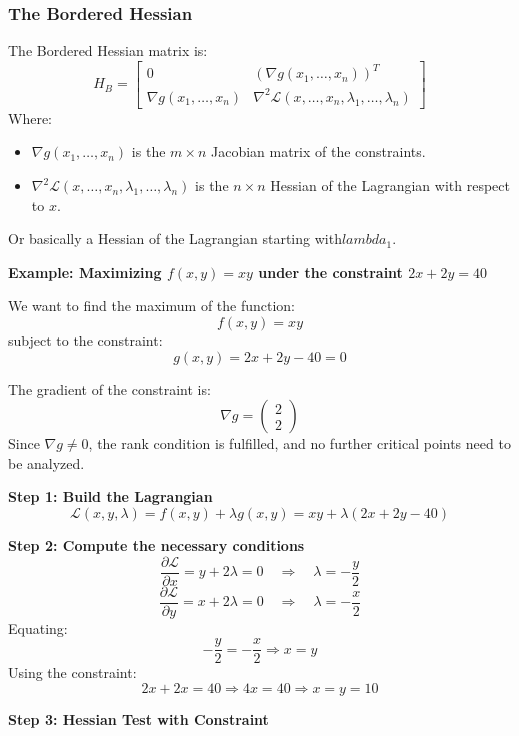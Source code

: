 \subsubsection{The Bordered Hessian}
The Bordered Hessian matrix is:
\[
H_B =
\begin{bmatrix}
0 & {\left( \nabla g(x_1, \dots, x_n) \right)}^T \\
\nabla g(x_1, \dots, x_n) & \nabla^2 \mathcal{L}(x, \dots, x_n, \lambda_1, \dots, \lambda_n)
\end{bmatrix}
\]
Where:
\begin{itemize}[label=\(-\)]
  \item \( \nabla  g(x_1, \dots, x_n) \) is the \( m \times n \) Jacobian matrix of the constraints.
  \item \( \nabla^2 \mathcal{L}(x, \dots, x_n, \lambda_1, \dots, \lambda_n) \) is the \( n \times n \) Hessian of the Lagrangian with respect to \( x \).
\end{itemize}

Or basically a Hessian of the Lagrangian starting with\(lambda_1\).
\vspace{\baselineskip}

\textbf{Example: Maximizing \( f(x, y) = xy \) under the constraint \( 2x + 2y = 40 \)}
\vspace{\baselineskip}

We want to find the maximum of the function:
\[
f(x, y) = xy
\]
subject to the constraint:
\[
g(x, y) = 2x + 2y - 40 = 0
\]

The gradient of the constraint is:
\[
\nabla g = \begin{pmatrix} 2 \\ 2 \end{pmatrix}
\]
Since \( \nabla g \ne 0 \), the rank condition is fulfilled, and no further critical points need to be analyzed.

\textbf{Step 1: Build the Lagrangian}
\[
\mathcal{L}(x, y, \lambda) = f(x, y) + \lambda g(x, y) = xy + \lambda (2x + 2y - 40)
\]

\textbf{Step 2: Compute the necessary conditions}
\[
\frac{\partial \mathcal{L}}{\partial x} = y + 2\lambda = 0 \quad \Rightarrow \quad \lambda = -\frac{y}{2}
\]
\[
\frac{\partial \mathcal{L}}{\partial y} = x + 2\lambda = 0 \quad \Rightarrow \quad \lambda = -\frac{x}{2}
\]
Equating:
\[
-\frac{y}{2} = -\frac{x}{2} \Rightarrow x = y
\]
Using the constraint:
\[
2x + 2x = 40 \Rightarrow 4x = 40 \Rightarrow x = y = 10
\]

\textbf{Step 3: Hessian Test with Constraint}

